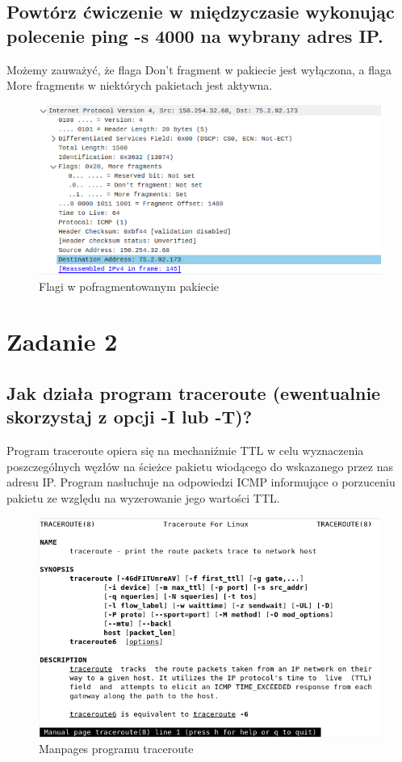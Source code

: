 \documentclass[polish, a4paper]{article}
\begin{document}
\subsection{Powtórz ćwiczenie w międzyczasie wykonując polecenie ping -s 4000 na wybrany adres IP.}

Możemy zauważyć, że flaga Don't fragment w pakiecie jest wyłączona, a flaga More fragments w niektórych pakietach jest aktywna.

\begin{figure}[H]
\centering
\includegraphics[width=\textwidth]{flagi 3.png}
\caption{Flagi w pofragmentowanym pakiecie}
\end{figure}

\section{Zadanie 2}
\subsection{Jak działa program traceroute (ewentualnie skorzystaj z opcji -I lub -T)?}

Program traceroute opiera się na mechaniźmie TTL w celu wyznaczenia poszczególnych węzłów na ścieżce pakietu wiodącego do wskazanego przez nas adresu IP. Program nasłuchuje na odpowiedzi ICMP informujące o porzuceniu pakietu ze względu na wyzerowanie jego wartości TTL. 

\begin{figure}[H]
\centering
\includegraphics[width=\textwidth]{tracert.png}
\caption{Manpages programu traceroute}
\end{figure}
\end{document}
